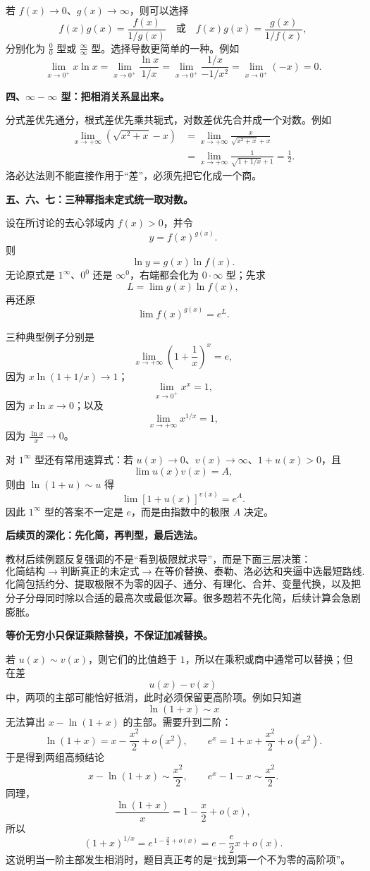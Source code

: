 \begin{knowledgeBox}
若 \(f(x)\to0\)、\(g(x)\to\infty\)，则可以选择
\[
f(x)g(x)=\frac{f(x)}{1/g(x)}
\quad\text{或}\quad
f(x)g(x)=\frac{g(x)}{1/f(x)},
\]
分别化为 \(\frac00\) 型或 \(\frac{\infty}{\infty}\) 型。选择导数更简单的一种。例如
\[
\lim_{x\to0^+}x\ln x
=\lim_{x\to0^+}\frac{\ln x}{1/x}
=\lim_{x\to0^+}\frac{1/x}{-1/x^2}
=\lim_{x\to0^+}(-x)=0.
\]

\textbf{四、\(\infty-\infty\) 型：把相消关系显出来。}

分式差优先通分，根式差优先乘共轭式，对数差优先合并成一个对数。例如
\[
\begin{aligned}
\lim_{x\to+\infty}\left(\sqrt{x^2+x}-x\right)
&=\lim_{x\to+\infty}
\frac{x}{\sqrt{x^2+x}+x}\\
&=\lim_{x\to+\infty}
\frac{1}{\sqrt{1+1/x}+1}
=\frac12.
\end{aligned}
\]
洛必达法则不能直接作用于“差”，必须先把它化成一个商。

\textbf{五、六、七：三种幂指未定式统一取对数。}

设在所讨论的去心邻域内 \(f(x)>0\)，并令
\[
y=f(x)^{g(x)}.
\]
则
\[
\ln y=g(x)\ln f(x).
\]
无论原式是 \(1^\infty\)、\(0^0\) 还是 \(\infty^0\)，右端都会化为 \(0\cdot\infty\) 型；先求
\[
L=\lim g(x)\ln f(x),
\]
再还原
\[
\lim f(x)^{g(x)}=e^L.
\]

三种典型例子分别是
\[
\lim_{x\to+\infty}\left(1+\frac1x\right)^x=e,
\]
因为 \(x\ln(1+1/x)\to1\)；
\[
\lim_{x\to0^+}x^x=1,
\]
因为 \(x\ln x\to0\)；以及
\[
\lim_{x\to+\infty}x^{1/x}=1,
\]
因为 \(\frac{\ln x}{x}\to0\)。

对 \(1^\infty\) 型还有常用速算式：若 \(u(x)\to0\)、\(v(x)\to\infty\)、\(1+u(x)>0\)，且
\[
\lim u(x)v(x)=A,
\]
则由 \(\ln(1+u)\sim u\) 得
\[
\lim[1+u(x)]^{v(x)}=e^A.
\]
因此 \(1^\infty\) 型的答案不一定是 \(e\)，而是由指数中的极限 \(A\) 决定。

\textbf{后续页的深化：先化简，再判型，最后选法。}

教材后续例题反复强调的不是“看到极限就求导”，而是下面三层决策：
\[
\text{化简结构}
\longrightarrow
\text{判断真正的未定式}
\longrightarrow
\text{在等价替换、泰勒、洛必达和夹逼中选最短路线}.
\]
化简包括约分、提取极限不为零的因子、通分、有理化、合并、变量代换，以及把分子分母同时除以合适的最高次或最低次幂。很多题若不先化简，后续计算会急剧膨胀。

\textbf{等价无穷小只保证乘除替换，不保证加减替换。}

若 \(u(x)\sim v(x)\)，则它们的比值趋于 \(1\)，所以在乘积或商中通常可以替换；但在差
\[
u(x)-v(x)
\]
中，两项的主部可能恰好抵消，此时必须保留更高阶项。例如只知道
\[
\ln(1+x)\sim x
\]
无法算出 \(x-\ln(1+x)\) 的主部。需要升到二阶：
\[
\ln(1+x)=x-\frac{x^2}{2}+o(x^2),
\qquad
e^x=1+x+\frac{x^2}{2}+o(x^2).
\]
于是得到两组高频结论
\[
x-\ln(1+x)\sim\frac{x^2}{2},
\qquad
e^x-1-x\sim\frac{x^2}{2}.
\]
同理，
\[
\frac{\ln(1+x)}{x}
=1-\frac{x}{2}+o(x),
\]
所以
\[
(1+x)^{1/x}
=e^{\,1-\frac{x}{2}+o(x)}
=e-\frac{e}{2}x+o(x).
\]
这说明当一阶主部发生相消时，题目真正考的是“找到第一个不为零的高阶项”。


\end{knowledgeBox}

